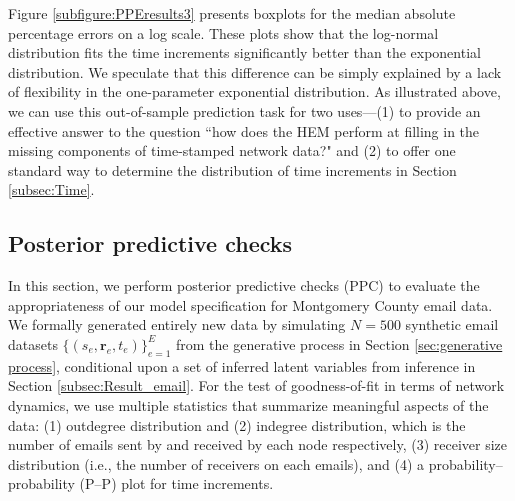 \documentclass[ba]{imsart}
\def\spacingset#1{\renewcommand{\baselinestretch}%
	{#1}\small\normalsize} \spacingset{1}
\numberwithin{equation}{section}
\theoremstyle{plain}
\begin{document}
	Figure \ref{subfigure:PPEresults3} presents boxplots for the median absolute percentage errors on a log scale. These plots show that the log-normal distribution fits the time increments significantly better than the exponential distribution. We speculate that this difference can be simply explained by a lack of flexibility in the one-parameter exponential distribution. As illustrated above, we can use this out-of-sample prediction task for two uses---(1) to provide an effective answer to the question ``how does the HEM perform at filling in the missing components of time-stamped network data?" and (2) to offer one standard way to determine the distribution of time increments in Section \ref{subsec:Time}. 
	
	\subsection{Posterior predictive checks}\label{subsec:PPC_email} 	   
	In this section, we perform posterior predictive checks (PPC) \citep{rubin1984bayesianly} to evaluate the appropriateness of our model specification for Montgomery County email data. We formally generated entirely new data by simulating $N=500$ synthetic email datasets $\{(s_{e}, \boldsymbol{r}_{e}, t_{e})\}_{e=1}^E$ from the generative process in Section \ref{sec:generative process}, conditional upon a set of inferred latent variables from inference in Section \ref{subsec:Result_email}. For the test of goodness-of-fit in terms of network dynamics, we use multiple statistics that summarize meaningful aspects of the data: (1) outdegree distribution and (2) indegree distribution, which is the number of emails sent by and received by each node respectively, (3) receiver size distribution (i.e., the number of receivers on each emails), and (4) a probability--probability (P--P) plot for time increments. 

\end{document}
